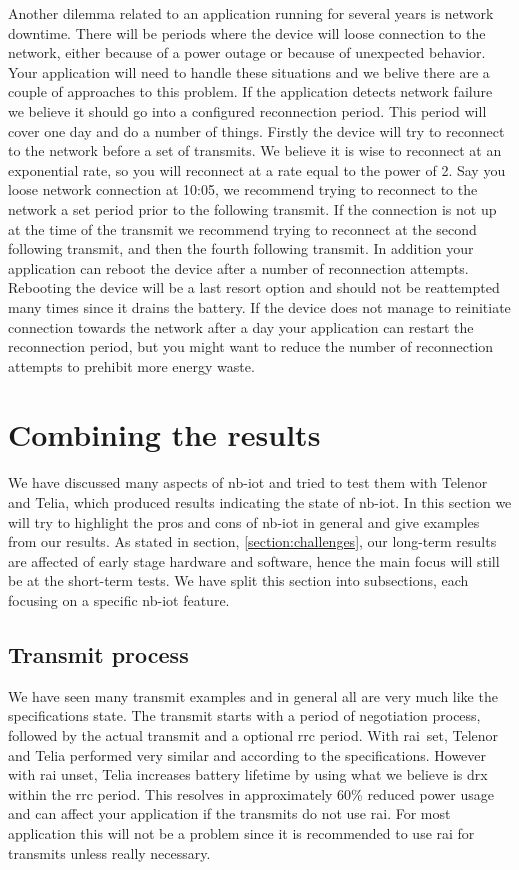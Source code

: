 \documentclass[USenglish]{ifimaster}  %
\begin{document}
Another dilemma related to an application running for several years is network downtime. There will be periods where the device will loose connection to the network, either because of a power outage or because of unexpected behavior. Your application will need to handle these situations and we belive there are a couple of approaches to this problem. If the application detects network failure we believe it should go into a configured reconnection period. This period will cover one day and do a number of things. Firstly the device will try to reconnect to the network before a set of transmits. We believe it is wise to reconnect at an exponential rate, so you will reconnect at a rate equal to the power of 2. Say you loose network connection at 10:05, we recommend trying to reconnect to the network a set period prior to the following transmit. If the connection is not up at the time of the transmit we recommend trying to reconnect at the second following transmit, and then the fourth following transmit. In addition your application can reboot the device after a number of reconnection attempts. Rebooting the device will be a last resort option and should not be reattempted many times since it drains the battery. If the device does not manage to reinitiate connection towards the network after a day your application can restart the reconnection period, but you might want to reduce the number of reconnection attempts to prehibit more energy waste.

\section{Combining the results}
We have discussed many aspects of \acrshort{nb-iot} and tried to test them with Telenor and Telia, which produced results indicating the state of \acrshort{nb-iot}. In this section we will try to highlight the pros and cons of \acrshort{nb-iot} in general and give examples from our results. As stated in section, \vref{section:challenges}, our long-term results are affected of early stage hardware and software, hence the main focus will still be at the short-term tests. We have split this section into subsections, each focusing on a specific \acrshort{nb-iot} feature.

\subsection{Transmit process}
We have seen many transmit examples and in general all are very much like the specifications state. The transmit starts with a period of negotiation process, followed by the actual transmit and a optional \acrshort{rrc} period. With \acrshort{rai} set, Telenor and Telia performed very similar and according to the specifications. However with \acrshort{rai} unset, Telia increases battery lifetime by using what we believe is \acrshort{drx} within the \acrshort{rrc} period. This resolves in approximately 60\% reduced power usage and can affect your application if the transmits do not use \acrshort{rai}. For most application this will not be a problem since it is recommended to use \acrshort{rai} for transmits unless really necessary.
\end{document}

